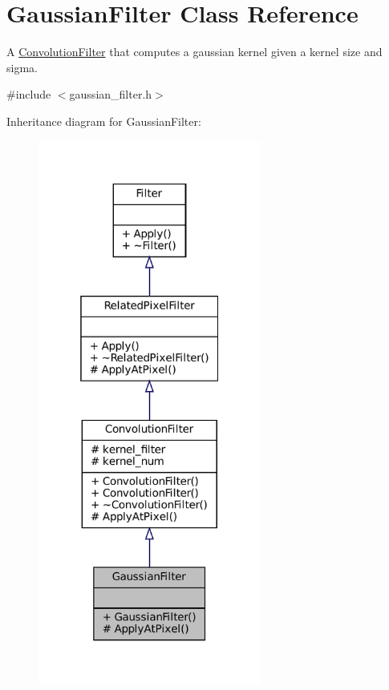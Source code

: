 \hypertarget{classGaussianFilter}{}\section{Gaussian\+Filter Class Reference}
\label{classGaussianFilter}


A \hyperlink{classConvolutionFilter}{Convolution\+Filter} that computes a gaussian kernel given a kernel size and sigma.  




{\ttfamily \#include $<$gaussian\+\_\+filter.\+h$>$}



Inheritance diagram for Gaussian\+Filter\+:\nopagebreak
\begin{figure}[H]
\begin{center}
\leavevmode
\includegraphics[width=208pt]{classGaussianFilter__inherit__graph}
\end{center}
\end{figure}


